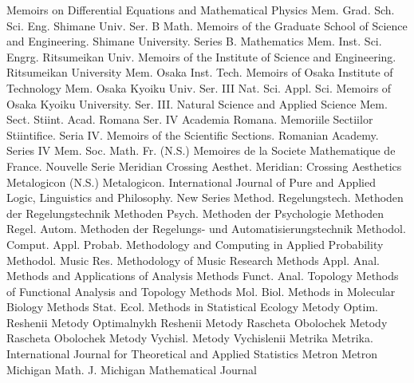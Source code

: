 {Memoirs on Differential Equations and Mathematical Physics}
{Mem. Grad. Sch. Sci. Eng. Shimane Univ. Ser. B Math.}
{Memoirs of the Graduate School of Science and Engineering. Shimane University. Series B. Mathematics}
{Mem. Inst. Sci. Engrg. Ritsumeikan Univ.}
{Memoirs of the Institute of Science and Engineering. Ritsumeikan University}
{Mem. Osaka Inst. Tech.}
{Memoirs of Osaka Institute of Technology}
{Mem. Osaka Kyoiku Univ. Ser. III Nat. Sci. Appl. Sci.}
{Memoirs of Osaka Kyoiku University. Ser. III. Natural Science and Applied Science}
{Mem. Sect. Stiint. Acad. Romana Ser. IV}
{Academia Romana. Memoriile Sectiilor Stiintifice. Seria IV. Memoirs of the Scientific Sections. Romanian Academy. Series IV}
{Mem. Soc. Math. Fr. (N.S.)}
{Memoires de la Societe Mathematique de France. Nouvelle Serie}
{Meridian Crossing Aesthet.}
{Meridian: Crossing Aesthetics}
{Metalogicon (N.S.)}
{Metalogicon. International Journal of Pure and Applied Logic, Linguistics and Philosophy. New Series}
{Method. Regelungstech.}
{Methoden der Regelungstechnik}
{Methoden Psych.}
{Methoden der Psychologie}
{Methoden Regel. Autom.}
{Methoden der Regelungs- und Automatisierungstechnik}
{Methodol. Comput. Appl. Probab.}
{Methodology and Computing in Applied Probability}
{Methodol. Music Res.}
{Methodology of Music Research}
{Methods Appl. Anal.}
{Methods and Applications of Analysis}
{Methods Funct. Anal. Topology}
{Methods of Functional Analysis and Topology}
{Methods Mol. Biol.}
{Methods in Molecular Biology}
{Methods Stat. Ecol.}
{Methods in Statistical Ecology}
{Metody Optim. Reshenii}
{Metody Optimalnykh Reshenii}
{Metody Rascheta Obolochek}
{Metody Rascheta Obolochek}
{Metody Vychisl.}
{Metody Vychislenii}
{Metrika}
{Metrika. International Journal for Theoretical and Applied Statistics}
{Metron}
{Metron}
{Michigan Math. J.}
{Michigan Mathematical Journal}
